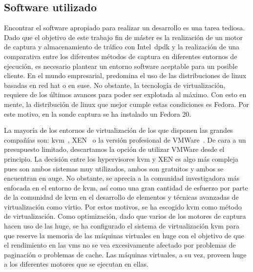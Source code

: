 \subsection{Software utilizado\label{sec:sw}}

Encontrar el software apropiado para realizar un desarrollo es una tarea tediosa. Dado que el objetivo de este trabajo fin de máster es la realización de un motor de captura y almacenamiento de tráfico con Intel~\gls{dpdk} y la realización de una comparativa entre los diferentes métodos de captura en diferentes entornos de ejecución, es necesario plantear un entorno software aceptable para un posible cliente.
%
En el mundo empresarial, predomina el uso de las distribuciones de linux basadas en red hat o en suse. No obstante, la tecnología de virtualización, requiere de los últimos avances para poder ser explotada al máximo. Con esto en mente, la distribución de linux que mejor cumple estas condiciones es Fedora. Por este motivo, en la sonde captura se ha instalado un Fedora 20.

La mayoría de los entornos de virtualización de los que disponen las grandes compañías son: \gls{kvm}~\cite{bib:kvm}, XEN~\cite{bib:xen} o la versión profesional de VMWare~\cite{bib:vmware}. De cara a un presupuesto limitado, descartamos la opción de utilizar VMWare desde el principio. La decisión entre los hypervisores \gls{kvm} y XEN es algo más compleja pues son ambos sistemas muy utilizados, ambos son gratuitos y ambos se encuentran en auge. No obstante, se aprecia a la comunidad investigadora más enfocada en el entorno de \gls{kvm}, así como una gran cantidad de esfuerzo por parte de la comunidad de \gls{kvm} en el desarrollo de elementos y técnicas avanzadas de virtualización como \gls{virtio}. Por estos motivos, se ha escogido \gls{kvm} como método de virtualización.
%
Como optimización, dado que varios de los motores de captura hacen uso de las \gls{huge}, se ha configurado el sistema de virtualización \gls{kvm} para que reserve la memoria de las máquinas virtuales en \gls{huge} con el objetivo de que el rendimiento en las \glspl{vm} no se vea excesivamente afectado por problemas de paginación o problemas de cache. Las máquinas virtuales, a su vez, proveen \gls{huge} a los diferentes motores que se ejecutan en ellas.


